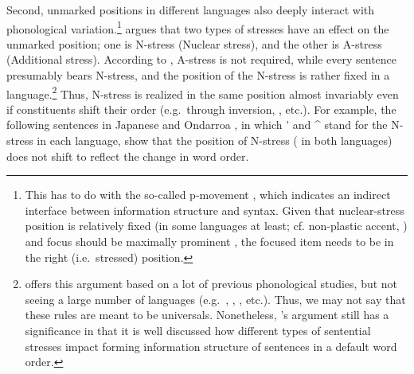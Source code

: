 \largerpage[2]
Second, unmarked  positions in different languages also
deeply interact with phonological variation.\footnote{This has to do
  with the so-called p-movement \citep{zubizarreta:98}, which
  indicates an indirect interface between information structure and
  syntax. Given that nuclear-stress position is relatively fixed (in
  some languages at least; cf. non-plastic accent,
  \citealt{vallduvi:90}) and focus should be maximally prominent
  \citep{buring:10}, the focused item needs to be in the right
  (i.e.\ stressed) position.}  \citet{ishihara:01} argues that two
types of stresses have an effect on the unmarked position; one is
N-stress (Nuclear stress), and the other is A-stress (Additional
stress). According to \citeauthor{ishihara:01}, A-stress is not
required, while every sentence presumably bears N-stress, and the
position of the N-stress is rather fixed in a
language.\footnote{\citet{ishihara:01} offers this argument based on a
  lot of previous phonological studies, but not seeing a large number
  of languages (e.g.\ , , ,
  etc.). Thus, we may not say that these rules are meant to be
  universals. Nonetheless, \citeauthor{ishihara:01}'s argument still
  has a significance in that it is well discussed how different types
  of sentential stresses impact forming information structure of
  sentences in a default word order.}  Thus, N-stress is realized in
the same position almost invariably even if constituents shift their
order (e.g.\ through inversion, , etc.). For example,
the following sentences in Japanese  and
Ondarroa  , in which
\'{\xspace} and \^{\xspace} stand for the N-stress in each language,
show that the position of N-stress ( in both languages)
does not shift to reflect the change in word order.







